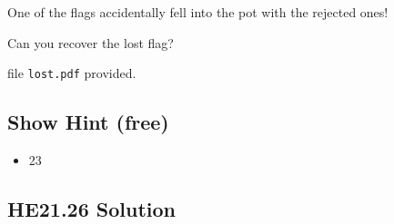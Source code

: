 \documentclass[english,a4paper,nols,noindent]{tufte-handout}
\begin{document}
\noindent One of the flags accidentally fell into the pot with the rejected ones!

Can you recover the lost flag?

file \verb+lost.pdf+ provided.

\subsection{Show Hint (free)}
\begin{itemize}
\item 23
\end{itemize}

\hypertarget{he21.26-solution}{%
\subsection{HE21.26 Solution}\label{he21.26-solution}}

\noindent 
\end{document}
